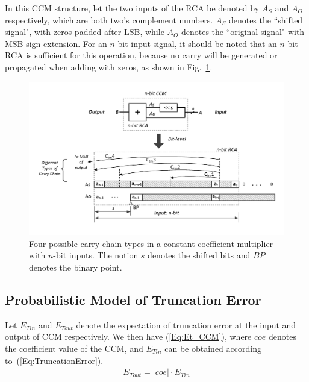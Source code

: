 \documentclass[prodmode,acmtrets]{acmsmall} %
\begin{document}
In this CCM structure, let the two inputs of the RCA be denoted by $A_S$ and $A_O$ respectively, which are both two's complement numbers. $A_S$ denotes the ``shifted signal", with zeros padded after LSB, while $A_O$ denotes the ``original signal" with MSB sign extension. For an $n$-bit input signal, it should be noted that an $n$-bit RCA is sufficient for this operation, because no carry will be generated or propagated when adding with zeros, as shown in Fig.~\ref{CCM_fig}.
%
\begin{figure}[htbp]
  \vspace{-5ex}
  \centering
  \includegraphics[width=\textwidth]{./Figures/CCM_CarryChain.pdf}
  \vspace{-6ex}
  \caption{Four possible carry chain types in a constant coefficient multiplier with $n$-bit inputs. The notion $s$ denotes the shifted bits and $BP$ denotes the binary point.}
  \label{CCM_fig}
  \vspace{-4ex}
\end{figure}

\subsection{Probabilistic Model of Truncation Error}
Let $E_{Tin}$ and $E_{Tout}$ denote the expectation of truncation error at the input and output of CCM respectively. We then have (\ref{Eq:Et_CCM}), where $coe$ denotes the coefficient value of the CCM, and $E_{Tin}$ can be obtained according to~(\ref{Eq:TruncationError}).
%
\begin{eqnarray}\label{Eq:Et_CCM}
  E_{Tout}=|coe|\cdot E_{Tin}
\end{eqnarray}
\end{document}
